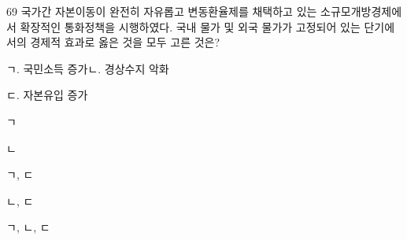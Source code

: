 \begin{question}{69}
국가간 자본이동이 완전히 자유롭고 변동환율제를 채택하고 있는 소규모개방경제에서 확장적인 통화정책을 시행하였다. 국내 물가 및 외국 물가가 고정되어 있는 단기에서의 경제적 효과로 옳은 것을 모두 고른 것은?
\begin{framedtext}
ㄱ. 국민소득 증가\hfill ㄴ. 경상수지 악화\hspace{3em} \par
ㄷ. 자본유입 증가
\end{framedtext}
\begin{choices}
  \item ㄱ
  \item ㄴ
  \item ㄱ, ㄷ
  \item ㄴ, ㄷ
  \item ㄱ, ㄴ, ㄷ
\end{choices}
\end{question}
